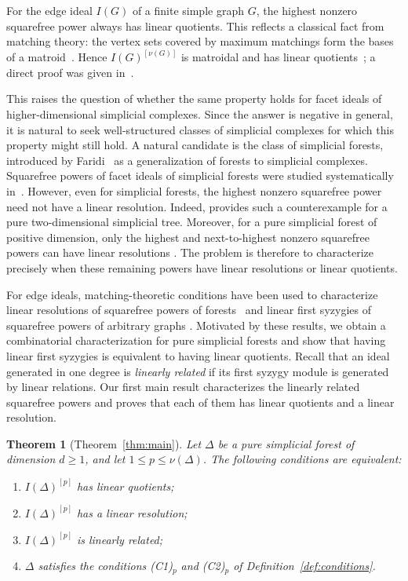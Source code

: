 \documentclass{amsart}
\newtheorem{IntroTheorem}{Theorem}
\theoremstyle{definition}
\theoremstyle{remark}
\begin{document}
For the edge ideal $I(G)$ of a finite simple graph $G$, the highest
nonzero squarefree power always has linear quotients. This reflects a classical fact from matching theory:
the vertex sets covered by maximum matchings form the bases of a
matroid~\cite[Sections~1 and~6]{EF}. Hence $I(G)^{[\nu(G)]}$ is
matroidal and has linear quotients~\cite[Theorem~12.6.2]{HHmonomialideals};
a direct proof was given in~\cite[Theorem~5.1]{BHZ18powersedgeideals}.


This raises the question of whether the same property holds
for facet ideals of higher-dimensional simplicial complexes.
Since the answer is negative in general, it is natural to
seek well-structured classes of simplicial complexes for
which this property might still hold. A natural candidate is the class of simplicial forests, introduced by Faridi~\cite{Faridi} as a generalization of forests to simplicial complexes. Squarefree powers of facet ideals of simplicial forests were studied systematically in~\cite{KNQ24squarefree,DRS}. However, even for simplicial forests, the highest nonzero squarefree power need not have a linear resolution. Indeed,
\cite[Example~2.3]{KNQ24squarefree} provides such a
counterexample for a pure two-dimensional simplicial tree.
Moreover, for a pure simplicial forest of positive dimension,
only the highest and next-to-highest nonzero squarefree powers
can have linear resolutions
\cite[Corollary~3.4]{KNQ24squarefree}.
The problem is therefore to characterize precisely when
these remaining powers have linear resolutions or linear
quotients.


For edge ideals, matching-theoretic conditions have been
used to characterize linear resolutions of squarefree
powers of forests~\cite{EHforests} and linear first
syzygies of squarefree powers of arbitrary graphs
\cite[Theorem~3.1]{NQT26}.
Motivated by these results, we obtain a combinatorial
characterization for pure simplicial forests and show
that having linear first syzygies is equivalent to
having linear quotients. Recall that an ideal generated
in one degree is {\em linearly related} if its first
syzygy module is generated by linear relations. Our first main result characterizes the linearly related squarefree
powers and proves that each of them has linear quotients and a linear
resolution.

\begin{IntroTheorem}[Theorem~\ref{thm:main}]\label{intro:main}
Let $\Delta$ be a pure simplicial forest of dimension $d\geq1$, and
let $1\leq p\leq\nu(\Delta)$. The following conditions are equivalent:
\begin{enumerate}
\item[\textnormal{(a)}] $I(\Delta)^{[p]}$ has linear quotients;
\item[\textnormal{(b)}] $I(\Delta)^{[p]}$ has a linear resolution;
\item[\textnormal{(c)}] $I(\Delta)^{[p]}$ is linearly related;
\item[\textnormal{(d)}] $\Delta$ satisfies the conditions
\textnormal{(C1)$_p$} and \textnormal{(C2)$_p$} of
Definition~\ref{def:conditions}.
\end{enumerate}
\end{IntroTheorem}
\end{document}
